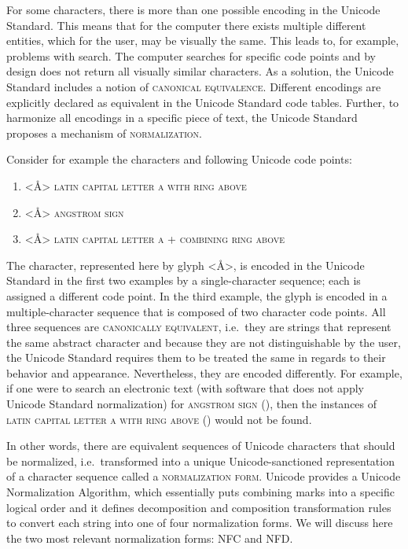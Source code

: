 For some characters, there is more than one possible encoding in the Unicode
Standard. This means that for the computer
there exists multiple different entities, which for the user, may be visually the same. This
leads to, for example, problems with search. The computer searches for specific 
code points and by design does not return all visually similar characters.
As a solution, the Unicode Standard includes a notion of \textsc{canonical
equivalence}. Different encodings are explicitly declared as equivalent in the
Unicode Standard code tables. Further, to harmonize all encodings in a specific
piece of text, the Unicode Standard proposes a mechanism of
\textsc{normalization}.

Consider for example the characters and following Unicode code points:
\begin{enumerate}
	\def\labelenumi{\arabic{enumi}.} 
	\item <Å> \textsc{latin capital letter a with ring above}  
	\item <Å> \textsc{angstrom sign} 
	\item <Å> \textsc{latin capital letter a} 
	+ \textsc{combining ring above} 
\end{enumerate}

The character, represented here by glyph <Å>, is encoded in the Unicode Standard
in the first two examples by a single-character sequence; each is assigned a
different code point. In the third example, the glyph is encoded in a
multiple-character sequence that is composed of two character code points. All
three sequences are \textsc{canonically equivalent}, i.e.~they are strings that
represent the same abstract character and because they are not distinguishable
by the user, the Unicode Standard requires them to be treated the same in
regards to their behavior and appearance. Nevertheless, they are encoded
differently. For example, if one were to search an electronic text (with
software that does not apply Unicode Standard normalization) for
\textsc{angstrom sign} (), then the instances of \textsc{latin 
capital letter a with ring above} () would not be found.

In other words, there are equivalent sequences of Unicode characters that should
be normalized, i.e.~transformed into a unique Unicode-sanctioned representation
of a character sequence called a \textsc{normalization form}. Unicode provides a
Unicode Normalization Algorithm, which essentially puts combining marks
into a specific logical order and it defines decomposition and composition
transformation rules to convert each string into one of four normalization
forms. We will discuss here the two most relevant normalization forms: NFC and
NFD.\@

